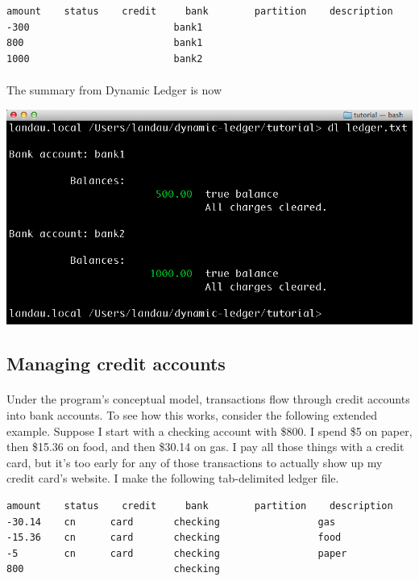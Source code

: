 \documentclass{article}
\begin{document}
\begin{flushleft}
\begin{lstlisting}[title=ledger.txt]
amount    status	credit     bank        partition    description
-300                         bank1
800                          bank1
1000                         bank2
\end{lstlisting}

\paragraph{} The summary from Dynamic Ledger is now

\begin{center}
\includegraphics[scale=.45]{fig/sum2.png}
\end{center}  





\subsection{Managing credit accounts}

\paragraph{} Under the program's conceptual model, transactions flow through credit accounts into bank accounts. To see how this works, consider the following extended example. Suppose I start with a checking account with \$800. I spend \$5 on paper, then \$15.36 on food, and then \$30.14 on gas. I pay all those things with a credit card, but it's too early for any of those transactions to actually show up my credit card's website. I make the following tab-delimited ledger file.

\begin{lstlisting}[title=ledger.txt]
amount    status	credit     bank        partition    description
-30.14    cn      card       checking                 gas
-15.36    cn      card       checking                 food
-5        cn      card       checking                 paper
800                          checking
\end{lstlisting}


\end{flushleft}
\end{document}
